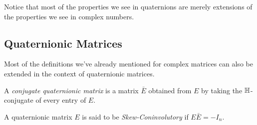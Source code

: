 
\begin{remark}
	Notice that most of the properties we see in quaternions are merely extensions of the properties we see in complex numbers. 
\end{remark}

\subsection{Quaternionic Matrices}

Most of the definitions we've already mentioned for complex matrices can also be extended in the context of quaternionic matrices.

\begin{definition}
	A \emph{conjugate quaternionic matrix} is a matrix $\bar{E}$ obtained from $E$ by taking the $\operatorname{\mathbb{H}}$-conjugate of every entry of $E$.
\end{definition}

\begin{definition}
	A quaternionic matrix $E$ is said to be \emph{Skew-Coninvolutory} if $E\bar{E} = -I_n$.
\end{definition}
